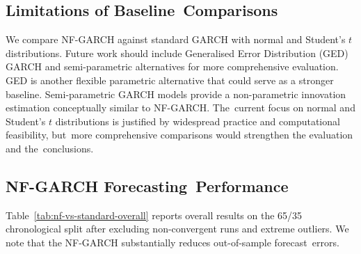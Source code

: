 \documentclass[risks,article,accept,pdftex,moreauthors]{Definitions/mdpi}
\begin{document}
\subsection{Limitations of Baseline~Comparisons}
We compare NF-GARCH against standard GARCH with normal and Student's $t$ distributions. Future work should include Generalised Error Distribution (GED) GARCH and semi-parametric alternatives \citep{engle1993measuring} for more comprehensive evaluation. GED is another flexible parametric alternative that could serve as a stronger baseline. Semi-parametric GARCH models \citep{engle1993measuring, hansen1994autoregressive} provide a non-parametric innovation estimation conceptually similar to NF-GARCH. The~current focus on normal and Student's $t$ distributions %
 is justified by widespread practice and computational feasibility, but~more comprehensive comparisons would strengthen the evaluation and the~conclusions.

\subsection{NF-GARCH Forecasting~Performance}
\label{sec:nf_forecast_results}

Table~\ref{tab:nf-vs-standard-overall} reports overall results on the 65/35 chronological split after excluding non-convergent runs and extreme outliers. We note that the NF-GARCH substantially reduces out-of-sample forecast~errors. 

\end{document}
